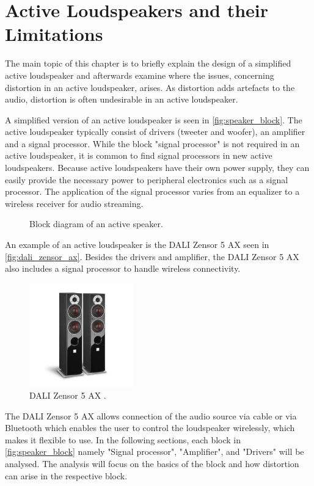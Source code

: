 


\chapter{Active Loudspeakers and their Limitations}
The main topic of this chapter is to briefly explain the design of a simplified active loudspeaker and afterwards examine where the issues, concerning distortion in an active loudspeaker, arises. As distortion adds artefacts to the audio, distortion is often undesirable in an active loudspeaker. 

A simplified version of an active loudspeaker is seen in \autoref{fig:speaker_block}. The active loudspeaker typically consist of drivers (tweeter and woofer), an amplifier and a signal processor. While the block "signal processor" is not required in an active loudspeaker, it is common to find signal processors in new active loudspeakers. Because active loudspeakers have their own power supply, they can easily provide the necessary power to peripheral electronics such as a signal processor. The application of the signal processor varies from an equalizer to a wireless receiver for audio streaming.

\begin{figure}[H]
\centering
{}
\scalebox{0.9}{
}
\caption{Block diagram of an active speaker.}
\label{fig:speaker_block}
\end{figure}

An example of an active loudspeaker is the DALI Zensor 5 AX seen in \autoref{fig:dali_zensor_ax}. Besides the drivers and amplifier, the DALI Zensor 5 AX also includes a signal processor to handle wireless connectivity.
\begin{figure}[H]
\centering
\includegraphics[width=0.4\textwidth]{figures/dali_zensor_1_ax.jpg}
\caption{DALI Zensor 5 AX  \citep{sou:daliZensor5}.}
\label{fig:dali_zensor_ax}
\end{figure}
The DALI Zensor 5 AX allows connection of the audio source via cable or via Bluetooth which enables the user to control the loudspeaker wirelessly, which makes it flexible to use. In the following sections, each block in \autoref{fig:speaker_block} namely "Signal processor", "Amplifier", and "Drivers" will be analysed. The analysis will focus on the basics of the block and how distortion can arise in the respective block.

